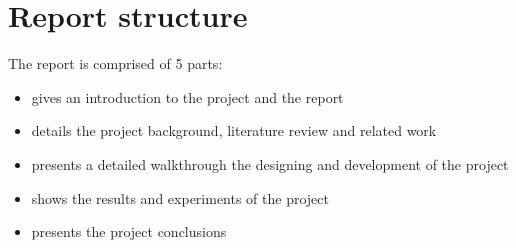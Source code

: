 \section{Report structure}
The report is comprised of 5 parts:

\begin{itemize}
    \item {} gives an introduction to the project and the report
    \item {} details the project background, literature review and related work
    \item {} presents a detailed walkthrough the designing and development of the project
    \item {} shows the results and experiments of the project
    \item {} presents the project conclusions
\end{itemize}
